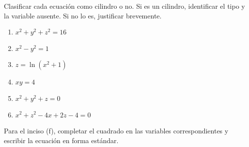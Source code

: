 Clasificar cada ecuación como cilindro o no. Si es un cilindro, identificar el tipo y la variable ausente. Si no lo es, justificar brevemente.
\begin{enumerate}
    \item $x^2 + y^2 + z^2 = 16$
    \item $x^2 - y^2 = 1$
    \item $z = \ln(x^2 + 1)$
    \item $xy = 4$
    \item $x^2 + y^2 + z = 0$
    \item $x^2 + z^2 - 4x + 2z - 4 = 0$
\end{enumerate}

Para el inciso (f), completar el cuadrado en las variables correspondientes y escribir la ecuación en forma estándar.